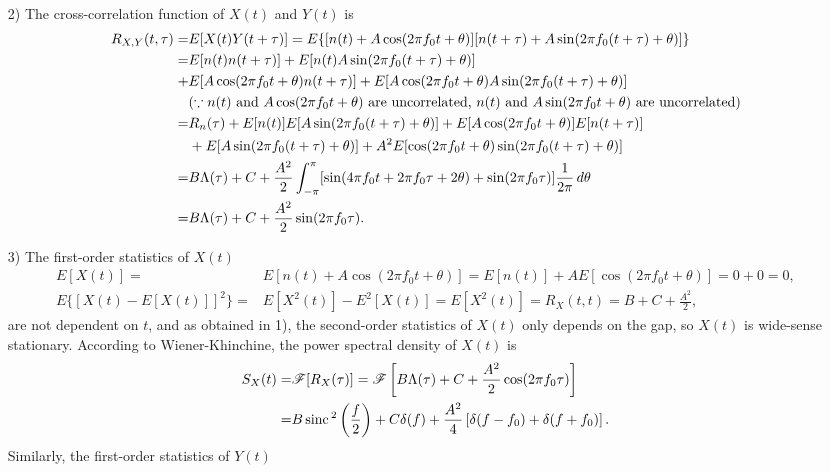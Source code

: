 \documentclass{assignment}
\begin{document}
\begin{sol}
\begin{itemize}
\begin{align}
        \end{align}
        \item[2)] The cross-correlation function of $X(t)$ and $Y(t)$ is
        \begin{align}
            \notag R_{X,Y}(t,\tau)=&E[X(t)Y(t+\tau)]=E\{[n(t)+A\cos(2\pi f_0t+\theta)][n(t+\tau)+A\sin(2\pi f_0(t+\tau)+\theta)]\}\\
            \notag=&E[n(t)n(t+\tau)]+E[n(t)A\sin(2\pi f_0(t+\tau)+\theta)]\\
            \notag+&E[A\cos(2\pi f_0t+\theta)n(t+\tau)]+E[A\cos(2\pi f_0t+\theta)A\sin(2\pi f_0(t+\tau)+\theta)]\\
            \notag&(\because n(t)\text{ and }A\cos(2\pi f_0t+\theta)\text{ are uncorrelated, }n(t)\text{ and }A\sin(2\pi f_0t+\theta)\text{ are uncorrelated})\\
            \notag=&R_n(\tau)+E[n(t)]E[A\sin(2\pi f_0(t+\tau)+\theta)]+E[A\cos(2\pi f_0t+\theta)]E[n(t+\tau)]\\
            \notag&+E[A\sin(2\pi f_0(t+\tau)+\theta)]+A^2E[\cos(2\pi f_0t+\theta)\sin(2\pi f_0(t+\tau)+\theta)]\\
            \notag=&B\Lambda(\tau)+C+\frac{A^2}{2}\int_{-\pi}^{\pi}[\sin(4\pi f_0t+2\pi f_0\tau+2\theta)+\sin(2\pi f_0\tau)]\frac{1}{2\pi}\,d\theta\\
            =&B\Lambda(\tau)+C+\frac{A^2}{2}\sin(2\pi f_0\tau).
        \end{align}
        \item[3)] The first-order statistics of $X(t)$
        \begin{align}
            E[X(t)]=&E[n(t)+A\cos(2\pi f_0t+\theta)]=E[n(t)]+AE[\cos(2\pi f_0t+\theta)]=0+0=0,\\
            E\{[X(t)-E[X(t)]]^2\}=&E[X^2(t)]-E^2[X(t)]=E[X^2(t)]=R_X(t,t)=B+C+\frac{A^2}{2},
        \end{align}
        are not dependent on $t$, and as obtained in 1), the second-order statistics of $X(t)$ only depends on the gap, so $X(t)$ is wide-sense stationary. According to Wiener-Khinchine, the power spectral density of $X(t)$ is
        \begin{align}
            \notag S_X(t)=&\mathscr{F}[R_X(\tau)]=\mathscr{F}\left[B\Lambda(\tau)+C+\frac{A^2}{2}\cos(2\pi f_0\tau)\right]\\
            =&B\,\text{sinc}\,^2\left(\frac{f}{2}\right)+C\delta(f)+\frac{A^2}{4}\left[\delta(f-f_0)+\delta(f+f_0)\right].
        \end{align}
        Similarly, the first-order statistics of $Y(t)$

\end{itemize}
\end{sol}
\end{document}
